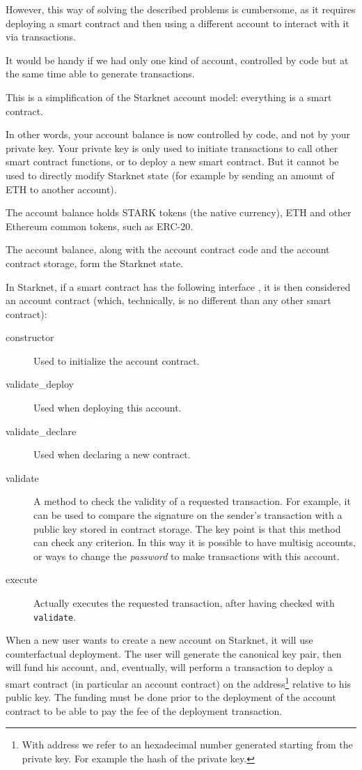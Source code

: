 \documentclass[12pt]{article}
\begin{document}
However, this way of solving the described problems is cumbersome, as it requires deploying a smart contract and then using a different account to interact with it via transactions.

It would be handy if we had only one kind of account, controlled by code but at the same time able to generate transactions.

This is a simplification of the Starknet account model: everything is a smart contract.

In other words, your account balance is now controlled by code, and not by your private key. Your private key is only used to initiate transactions to call other smart contract functions, or to deploy a new smart contract. But it cannot be used to directly modify Starknet state (for example by sending an amount of ETH to another account).

The account balance holds STARK tokens (the native currency), ETH and other Ethereum common tokens, such as ERC-20.

The account balance, along with the account contract code and the account contract storage, form the Starknet state.

In Starknet, if a smart contract has the following interface \cite{starknet_account_abstraction}, it is then considered an account contract (which, technically, is no different than any other smart contract):
\begin{description}
    \item[constructor] Used to initialize the account contract.
    \item[validate\_deploy] Used when deploying this account.
    \item[validate\_declare] Used when declaring a new contract.
    \item[validate] A method to check the validity of a requested transaction. For example, it can be used to compare the signature on the sender's transaction with a public key stored in contract storage. The key point is that this method can check any criterion. In this way it is possible to have multisig accounts, or ways to change the \emph{password} to make transactions with this account. 
    \item[execute] Actually executes the requested transaction, after having checked with \verb|validate|.  
\end{description}

When a new user wants to create a new account on Starknet, it will use counterfactual deployment. The user will generate the canonical key pair, then will fund his account, and, eventually, will perform a transaction to deploy a smart contract (in particular an account contract) on the address\footnote{With address we refer to an hexadecimal number generated starting from the private key. For example the hash of the private key.} relative to his public key. The funding must be done prior to the deployment of the account contract to be able to pay the fee of the deployment transaction.
\end{document}
